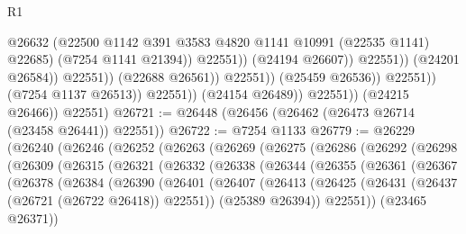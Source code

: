 \begin{lexlean}{R1}
\begin{coremodule}
                                                  @26632
                                                  (@22500
                                                    @1142
                                                    @391
                                                    @3583
                                                    @4820
                                                    @1141
                                                    @10991
                                                    (@22535 @1141)
                                                    @22685)
                                                  (@7254 @1141 @21394))
                                                @22551))
                                            (@24194 @26607))
                                          @22551))
                                      (@24201 @26584))
                                    @22551))
                                (@22688 @26561))
                              @22551))
                          (@25459 @26536))
                        @22551))
                    (@7254 @1137 @26513))
                  @22551))
              (@24154 @26489))
            @22551))
        (@24215 @26466))
      @22551)
@26721 := @26448 (@26456 (@26462 (@26473 @26714 (@23458 @26441)) @22551))
@26722 := @7254 @1133
@26779 := @26229
    (@26240
      (@26246
        (@26252
          (@26263
            (@26269
              (@26275
                (@26286
                  (@26292
                    (@26298
                      (@26309
                        (@26315
                          (@26321
                            (@26332
                              (@26338
                                (@26344
                                  (@26355
                                    (@26361
                                      (@26367
                                        (@26378
                                          (@26384
                                            (@26390
                                              (@26401
                                                (@26407
                                                  (@26413
                                                    (@26425
                                                      (@26431
                                                        (@26437 (@26721 (@26722 @26418)) @22551))
                                                      (@25389 @26394))
                                                    @22551))
                                                (@23465 @26371))

\end{coremodule}
\end{lexlean}
